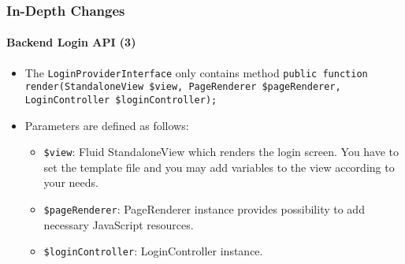 \begin{frame}[fragile]
	\frametitle{In-Depth Changes}
	\framesubtitle{Backend Login API (3)}

	\begin{itemize}

		\item The \texttt{LoginProviderInterface} only contains method\newline
			\smaller\texttt{public function render(StandaloneView \$view, PageRenderer \$pageRenderer, LoginController \$loginController);}\normalsize

		\item Parameters are defined as follows:

			\begin{itemize}

				\item \texttt{\$view}:\newline
					Fluid StandaloneView which renders the login screen. You have to set
					the template file and you may add variables to the view according to
					your needs.

				\item \texttt{\$pageRenderer}:\newline
					PageRenderer instance provides possibility to add necessary JavaScript
					resources.

				\item \texttt{\$loginController}:\newline
					LoginController instance.

			\end{itemize}

	\end{itemize}

\end{frame}


